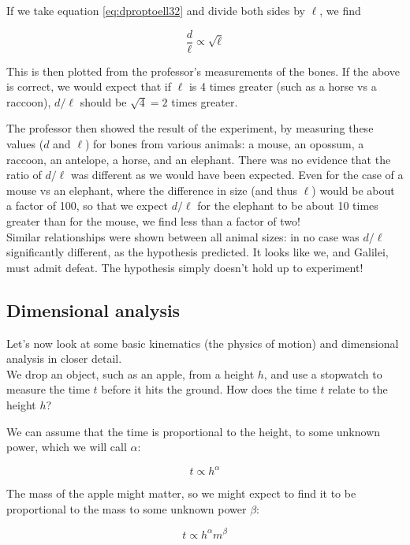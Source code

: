 \documentclass[8.01x]{subfiles}
\begin{document}
If we take equation \eqref{eq:dproptoell32} and divide both sides by $\ell$, we find

\begin{equation}
\frac{d}{\ell} \propto \sqrt{\ell}
\end{equation}

This is then plotted from the professor's measurements of the bones. If the above is correct, we would expect that if $\ell$ is 4 times greater (such as a horse vs a raccoon), $d/\ell$ should be $\sqrt{4} = 2$ times greater.

The professor then showed the result of the experiment, by measuring these values ($d$ and $\ell$) for bones from various animals: a mouse, an opossum, a raccoon, an antelope, a horse, and an elephant. There was no evidence that the ratio of $d/\ell$ was different as we would have been expected. Even for the case of a mouse vs an elephant, where the difference in size (and thus $\ell$) would be about a factor of 100, so that we expect $d/\ell$ for the elephant to be about 10 times greater than for the mouse, we find less than a factor of two!\\
Similar relationships were shown between all animal sizes: in no case was $d/\ell$ significantly different, as the hypothesis predicted. It looks like we, and Galilei, must admit defeat. The hypothesis simply doesn't hold up to experiment!

\subsection{Dimensional analysis}

Let's now look at some basic kinematics (the physics of motion) and dimensional analysis in closer detail.\\
We drop an object, such as an apple, from a height $h$, and use a stopwatch to measure the time $t$ before it hits the ground. How does the time $t$ relate to the height $h$?

We can assume that the time is proportional to the height, to some unknown power, which we will call $\alpha$:

\begin{equation*}
 t \propto h^\alpha
\end{equation*}

The mass of the apple might matter, so we might expect to find it to be proportional to the mass to some unknown power $\beta$:

\begin{equation*}
 t \propto h^\alpha m^\beta
\end{equation*}
\end{document}
